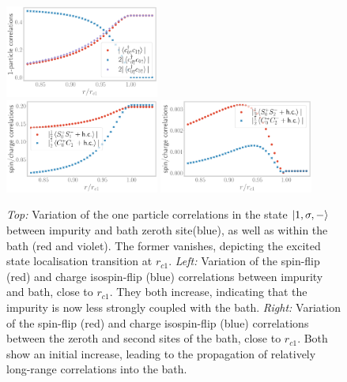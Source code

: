 \documentclass{iopart}
\begin{document}
\begin{figure}[htpb]
	\centering
	\includegraphics[width=0.45\textwidth]{Uc1-1p.pdf}\\
	\includegraphics[width=0.45\textwidth]{Uc1-spin-charge-01.pdf}
	\hspace*{\fill}
	\includegraphics[width=0.45\textwidth]{Uc1-spin-charge-02.pdf}
	\caption{{\it Top:} Variation of the one particle correlations in the state \(\ket{1,\sigma,-}\) between impurity and bath zeroth site(blue), as well as within the bath (red and violet). The former vanishes, depicting the excited state localisation transition at \(r_{c1}\). {\it Left:} Variation of the spin-flip (red) and charge isospin-flip (blue) correlations between impurity and bath, close to \(r_{c1}\). They both increase, indicating that the impurity is now less strongly coupled with the bath. {\it Right:} Variation of the spin-flip (red) and charge isospin-flip (blue) correlations between the zeroth and second sites of the bath, close to \(r_{c1}\). Both show an initial increase, leading to the propagation of relatively long-range correlations into the bath.}
	\label{Uc1-sc-02}
\end{figure}
\end{document}
